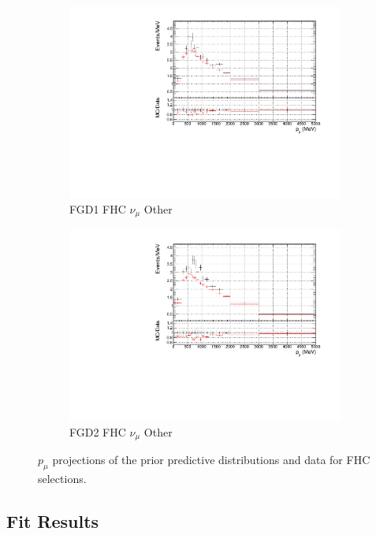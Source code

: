 \begin{figure}[!htbp]
\begin{subfigure}{0.49\textwidth}
  \centering
  \includegraphics[width=\textwidth]{figs/prioronly1D_p_FGD1_numuCC_other}
  \caption{FGD1 FHC $\nu_{\mu}$ Other}
\end{subfigure}
\begin{subfigure}{0.49\textwidth}
  \centering
  \includegraphics[width=\textwidth]{figs/prioronly1D_p_FGD2_numuCC_other}
  \caption{FGD2 FHC $\nu_{\mu}$ Other}
\end{subfigure}
\caption{$p_{\mu}$ projections of the prior predictive distributions and data for FHC \numu selections.}
\label{fig:priorpred_fhc_p}
\end{figure}

\subsection{Fit Results}

